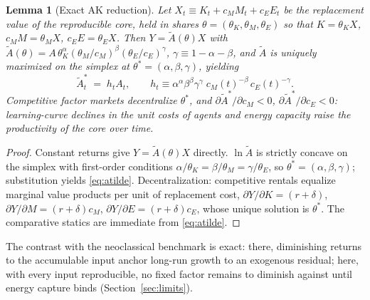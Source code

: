 \documentclass[11pt]{article}
\newtheorem{lemma}{Lemma}
\begin{document}
\begin{lemma}[Exact AK reduction]\label{lem:ak}
Let $X_t \equiv K_t + c_M M_t + c_E E_t$ be the replacement value of the reproducible core, held in shares $\theta=(\theta_K,\theta_M,\theta_E)$ so that $K=\theta_K X$, $c_M M = \theta_M X$, $c_E E = \theta_E X$. Then $Y = \tilde A(\theta) X$ with $\tilde A(\theta) = A\,\theta_K^{\alpha}(\theta_M/c_M)^{\beta}(\theta_E/c_E)^{\gamma}$, $\gamma \equiv 1-\alpha-\beta$, and $\tilde A$ is uniquely maximized on the simplex at $\theta^{*}=(\alpha,\beta,\gamma)$, yielding
\begin{equation}
\tilde A^{*}_t \;=\; h_t A_t, \qquad h_t \equiv \alpha^{\alpha}\beta^{\beta}\gamma^{\gamma}\; c_M(t)^{-\beta}\, c_E(t)^{-\gamma}.
\label{eq:atilde}
\end{equation}
Competitive factor markets decentralize $\theta^{*}$, and $\partial \tilde A^{*}/\partial c_M < 0$, $\partial \tilde A^{*}/\partial c_E < 0$: learning-curve declines in the unit costs of agents and energy capacity raise the productivity of the core over time.
\end{lemma}

\begin{proof}
Constant returns give $Y=\tilde A(\theta)X$ directly. $\ln\tilde A$ is strictly concave on the simplex with first-order conditions $\alpha/\theta_K = \beta/\theta_M = \gamma/\theta_E$, so $\theta^{*}=(\alpha,\beta,\gamma)$; substitution yields \eqref{eq:atilde}. Decentralization: competitive rentals equalize marginal value products per unit of replacement cost, $\partial Y/\partial K = (r+\delta)$, $\partial Y/\partial M = (r+\delta)c_M$, $\partial Y/\partial E = (r+\delta)c_E$, whose unique solution is $\theta^{*}$. The comparative statics are immediate from \eqref{eq:atilde}.
\end{proof}

The contrast with the neoclassical benchmark \citep{solow1956} is exact: there, diminishing returns to the accumulable input anchor long-run growth to an exogenous residual; here, with every input reproducible, no fixed factor remains to diminish against until energy capture binds (Section~\ref{sec:limits}).
\end{document}
